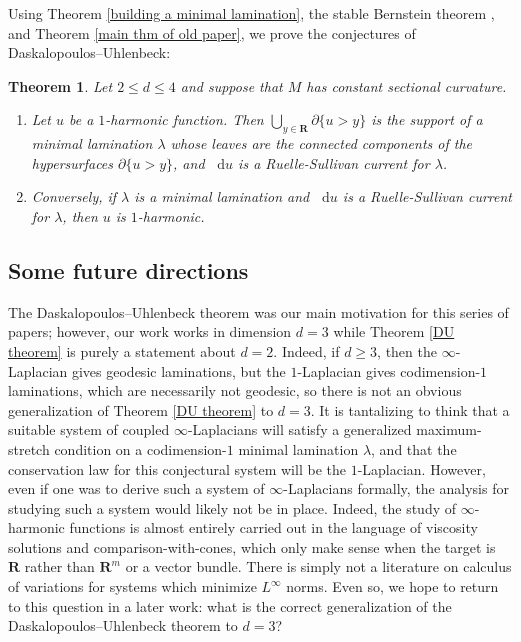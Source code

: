 \documentclass[reqno,11pt]{amsart}
\newcommand{\RR}{\mathbf{R}}
\newcommand*\dif{\mathop{}\!\mathrm{d}}
\newtheorem{theorem}{Theorem}[section]
\theoremstyle{definition}
\numberwithin{equation}{section}
\begin{document}
Using Theorem \ref{building a minimal lamination}, the stable Bernstein theorem \cite{Schoen2016, Chodosh2021}, and Theorem \ref{main thm of old paper}, we prove the conjectures of Daskalopoulos--Uhlenbeck:

\begin{theorem}\label{main thm}
Let $2 \leq d \leq 4$ and suppose that $M$ has constant sectional curvature.
\begin{enumerate}
\item Let $u$ be a $1$-harmonic function.
Then $\bigcup_{y \in \RR} \partial \{u > y\}$ is the support of a minimal lamination $\lambda$ whose leaves are the connected components of the hypersurfaces $\partial \{u > y\}$, and $\dif u$ is a Ruelle-Sullivan current for $\lambda$.
\item Conversely, if $\lambda$ is a minimal lamination and $\dif u$ is a Ruelle-Sullivan current for $\lambda$, then $u$ is $1$-harmonic.
\end{enumerate}
\end{theorem}

\subsection{Some future directions}
The Daskalopoulos--Uhlenbeck theorem was our main motivation for this series of papers; however, our work works in dimension $d = 3$ while Theorem \ref{DU theorem} is purely a statement about $d = 2$.
Indeed, if $d \geq 3$, then the $\infty$-Laplacian gives geodesic laminations, but the $1$-Laplacian gives codimension-$1$ laminations, which are necessarily not geodesic, so there is not an obvious generalization of Theorem \ref{DU theorem} to $d = 3$.
It is tantalizing to think that a suitable system of coupled $\infty$-Laplacians will satisfy a generalized maximum-stretch condition on a codimension-$1$ minimal lamination $\lambda$, and that the conservation law for this conjectural system will be the $1$-Laplacian.
However, even if one was to derive such a system of $\infty$-Laplacians formally, the analysis for studying such a system would likely not be in place.
Indeed, the study of $\infty$-harmonic functions is almost entirely carried out in the language of viscosity solutions and comparison-with-cones, which only make sense when the target is $\RR$ rather than $\RR^m$ or a vector bundle.
There is simply not a literature on calculus of variations for systems which minimize $L^\infty$ norms.
Even so, we hope to return to this question in a later work: what is the correct generalization of the Daskalopoulos--Uhlenbeck theorem to $d = 3$?
\end{document}
